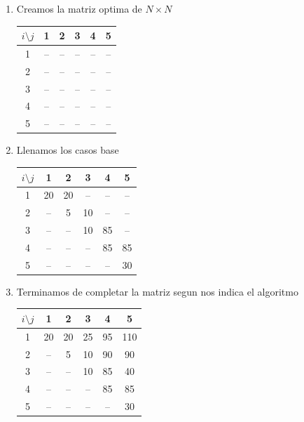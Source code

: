 \begin{enumerate}
    \item Creamos la matriz optima de $N \times N$ 
    \begin{table}[h!]
    \centering
    \begin{tabular}{cccccc}
    \toprule
    $i \setminus j$ & 1 & 2 & 3 & 4 & 5 \\
    \midrule
    1 & -- & -- & -- & -- & -- \\
    2 & -- & -- & -- & -- & -- \\
    3 & -- & -- & -- & -- & -- \\
    4 & -- & -- & -- & -- & -- \\
    5 & -- & -- & -- & -- & -- \\
    \bottomrule
    \end{tabular}
    \end{table}

    \item Llenamos los casos base
    \begin{table}[h!]
    \centering
    \begin{tabular}{cccccc}
    \toprule
    $i \setminus j$ & 1 & 2 & 3 & 4 & 5 \\
    \midrule
    1 & 20 & 20 & -- & -- & -- \\
    2 & -- & 5  & 10 & -- & -- \\
    3 & -- & -- & 10 & 85 & -- \\
    4 & -- & -- & -- & 85 & 85 \\
    5 & -- & -- & -- & -- & 30 \\
    \bottomrule
    \end{tabular}
    \end{table}

    \item Terminamos de completar la matriz segun nos indica el algoritmo
    \begin{table}[H]
    \centering
    \begin{tabular}{cccccc}
    \toprule
    $i \setminus j$ & 1 & 2 & 3 & 4 & 5 \\
    \midrule
    1 & 20 & 20 & 25 & 95 & 110 \\
    2 & -- & 5  & 10 & 90 & 90  \\
    3 & -- & -- & 10 & 85 & 40  \\
    4 & -- & -- & -- & 85 & 85  \\
    5 & -- & -- & -- & -- & 30  \\
    \bottomrule
    \end{tabular}
    \end{table}
\end{enumerate}

